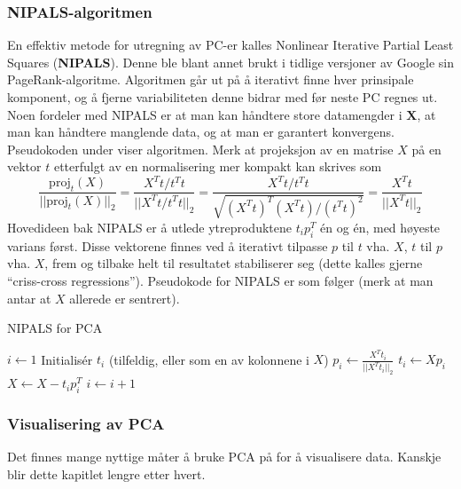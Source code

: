 \subsubsection{NIPALS-algoritmen}
En effektiv metode for utregning av PC-er kalles Nonlinear Iterative Partial Least Squares (\textbf{NIPALS}). Denne ble blant annet brukt i tidlige versjoner av Google sin PageRank-algoritme. Algoritmen går ut på å iterativt finne hver prinsipale komponent, og å fjerne variabiliteten denne bidrar med før neste PC regnes ut. Noen fordeler med NIPALS er at man kan håndtere store datamengder i $\mathbf{X}$, at man kan håndtere manglende data, og at man er garantert konvergens. Pseudokoden under viser algoritmen. Merk at projeksjon av en matrise $X$ på en vektor $t$ etterfulgt av en normalisering mer kompakt kan skrives som 
\begin{equation}\frac{\textrm{proj}_t(X)}{|| \textrm{proj}_t(X) ||_2} = \frac{X^T t / t^T t}{|| X^T t / t^T t ||_2} = \frac{X^T t / t^T t}{\sqrt{(X^T t)^T (X^T t) / (t^T t)^2}} = \frac{X^T t}{|| X^T t ||_2}
\label{eq:normalisering_triks}
\end{equation}
Hovedideen bak NIPALS er å utlede ytreproduktene $t_i p_i^T$ én og én, med høyeste varians først. Disse vektorene finnes ved å iterativt tilpasse $p$ til $t$ vha. $X$, $t$ til $p$ vha. $X$, frem og tilbake helt til resultatet stabiliserer seg (dette kalles gjerne ``criss-cross regressions''). Pseudokode for NIPALS er som følger (merk at man antar at $X$ allerede er sentrert).

\begin{algorithm}
	\caption{NIPALS for PCA}\label{alg:nipals_pca} \begin{algorithmic}[1] 
	\State $i \gets 1$
	\State Initialisér $t_i$ (tilfeldig, eller som en av kolonnene i $X$)
	\State $p_i \gets \frac{X^T t_i}{|| X^T t_i ||_2}$ 
	\State $t_i \gets X p_i$ 
	\EndWhile
	\State $X \gets X - t_i p_i^T$ 
	\State $i \gets i + 1$
	\EndWhile
\EndProcedure
\end{algorithmic}
\end{algorithm}

\subsubsection{Visualisering av PCA}
Det finnes mange nyttige måter å bruke PCA på for å visualisere data. Kanskje blir dette kapitlet lengre etter hvert.

